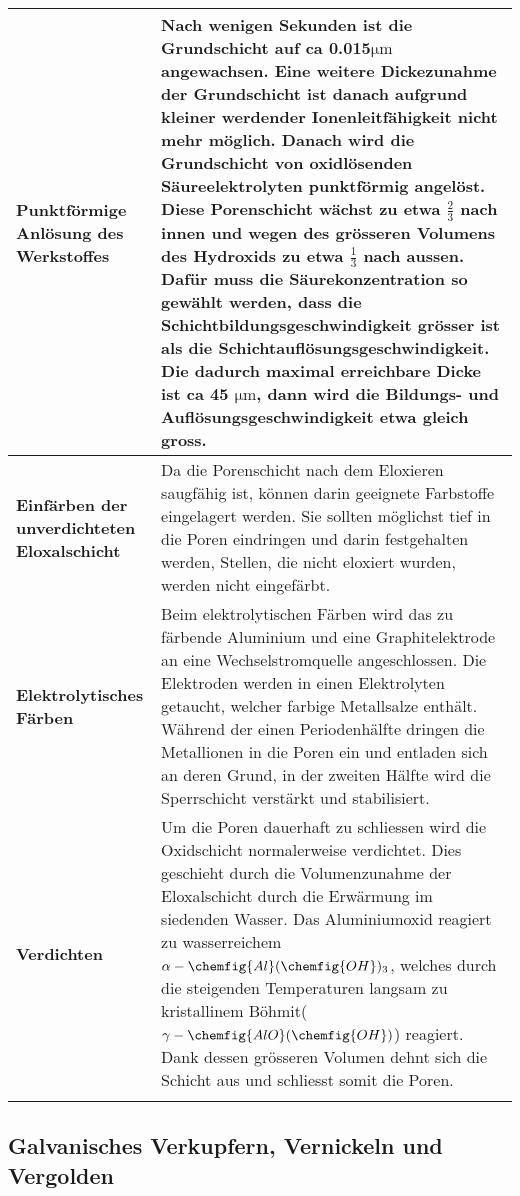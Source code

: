 \begin{longtable}{p{3cm}p{14cm}}
	\hline
	\textbf{Punktförmige Anlösung des Werkstoffes}
		& Nach wenigen Sekunden ist die Grundschicht auf ca 0.015$\mathrm{\mu m}$ angewachsen. Eine weitere Dickezunahme der Grundschicht ist danach aufgrund kleiner werdender Ionenleitfähigkeit nicht mehr möglich. Danach wird die Grundschicht von oxidlösenden Säureelektrolyten punktförmig angelöst. Diese Porenschicht wächst zu etwa $\frac{2}{3}$ nach innen und wegen des grösseren Volumens des Hydroxids zu etwa $\frac{1}{3}$ nach aussen. Dafür muss die Säurekonzentration so gewählt werden, dass die Schichtbildungsgeschwindigkeit grösser ist als die Schichtauflösungsgeschwindigkeit. Die dadurch maximal erreichbare Dicke ist ca 45 $\mathrm{\mu m}$, dann wird die Bildungs- und Auflösungsgeschwindigkeit etwa gleich gross.\\
	\hline
	\textbf{Einfärben der unverdichteten Eloxalschicht}
		& Da die Porenschicht nach dem Eloxieren saugfähig ist, können darin geeignete Farbstoffe eingelagert werden. Sie sollten möglichst tief in die Poren eindringen und darin festgehalten werden, Stellen, die nicht eloxiert wurden, werden nicht eingefärbt.\\
	\hline
	\textbf{Elektrolytisches Färben}
		& Beim elektrolytischen Färben wird das zu färbende Aluminium und eine Graphitelektrode an eine Wechselstromquelle angeschlossen. Die Elektroden werden in einen Elektrolyten getaucht, welcher farbige Metallsalze enthält. Während der einen Periodenhälfte dringen die Metallionen in die Poren ein und entladen sich an deren Grund, in der zweiten Hälfte wird die Sperrschicht verstärkt und stabilisiert.\\
	\hline
	\textbf{Verdichten}
		& Um die Poren dauerhaft zu schliessen wird die Oxidschicht normalerweise verdichtet. Dies geschieht durch die Volumenzunahme der Eloxalschicht durch die Erwärmung im siedenden Wasser. Das Aluminiumoxid reagiert zu wasserreichem $\alpha-\chemfig{Al}(\chemfig{OH})_3$, welches durch die steigenden Temperaturen langsam zu kristallinem Böhmit($\gamma-\chemfig{AlO}(\chemfig{OH})$) reagiert. Dank dessen grösseren Volumen dehnt sich die Schicht aus und schliesst somit die Poren.\\
	\newpage
\end{longtable}

\subsection{Galvanisches Verkupfern, Vernickeln und Vergolden}

